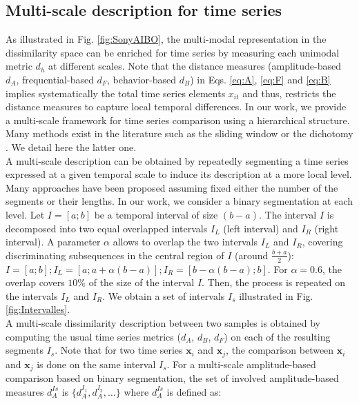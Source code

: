 \subsection{Multi-scale description for time series} 
As illustrated in Fig. \ref{fig:SonyAIBO}, the multi-modal representation in the dissimilarity space can be enriched for time series by measuring each unimodal metric $d_h$ at different scales. Note that the distance measures (amplitude-based $d_A$, frequential-based $d_F$, behavior-based $d_B$) in Eqs. \ref{eq:A}, \ref{eq:F} and \ref{eq:B} implies systematically the total time series elements $x_{it}$ and thus, restricts the distance measures to capture local temporal differences. In our work, we provide a multi-scale framework for time series comparison using a hierarchical structure. Many methods exist in the literature such as the sliding window or the dichotomy . We detail here the latter one. \\
\indent A multi-scale description can be obtained by repeatedly segmenting a time series expressed at a given temporal scale to induce its description at a more local level. Many approaches have been proposed assuming fixed either the number of the segments or their lengths. In our work, we consider a binary segmentation at each level. Let $I=[a;b]$ be a temporal interval of size $(b-a)$. The interval $I$ is decomposed into two equal overlapped intervals $I_L$ (left interval) and $I_R$ (right interval). A parameter $\alpha$ allows to overlap the two intervals $I_L$ and $I_R$, covering discriminating subsequences in the central region of $I$ (around $\frac{b+a}{2}$): $I = [a;b]; I_L = [a;a+\alpha(b-a)]; I_R = [b-\alpha(b-a);b]$. 
\noindent For $\alpha = 0.6$, the overlap covers $10\%$ of the size of the interval $I$. Then, the process is repeated on the intervals $I_L$ and $I_R$. We obtain a set of intervals $I_s$ illustrated in Fig. \ref{fig:Intervalles}. \\
A multi-scale dissimilarity description between two samples is obtained by computing the usual time series metrics ($d_A$, $d_B$, $d_F$) on each of the resulting segments $I_s$. Note that for two time series $\textbf{x}_i$ and $\textbf{x}_j$, the comparison between $\textbf{x}_i$ and $\textbf{x}_j$ is done on the same interval $I_s$. For a multi-scale amplitude-based comparison based on binary segmentation, the set of involved amplitude-based measures $d^{Is}_A$ is $\{d^{I_1}_A, d^{I_2}_A, \ldots \}$ where $d^{Is}_A$ is defined as:
